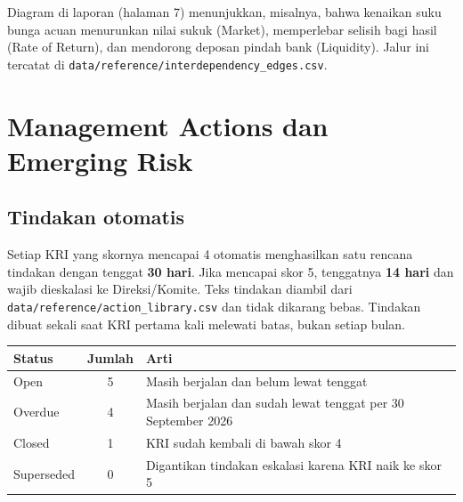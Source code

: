 \documentclass[11pt,a4paper]{article}
\newcommand{\file}[1]{\texttt{\small #1}}
\begin{document}
\begin{infobox}
Diagram di laporan (halaman 7) menunjukkan, misalnya, bahwa kenaikan suku bunga acuan menurunkan nilai sukuk (Market), memperlebar selisih bagi hasil (Rate of Return), dan mendorong deposan pindah bank (Liquidity). Jalur ini tercatat di \file{data/reference/interdependency\_\allowbreak{}edges.csv}.
\end{infobox}
\section{Management Actions dan Emerging Risk}\label{sec:actions}

\subsection{Tindakan otomatis}

Setiap KRI yang skornya mencapai 4 otomatis menghasilkan satu rencana tindakan dengan tenggat \textbf{30 hari}. Jika mencapai skor 5, tenggatnya \textbf{14 hari} dan wajib dieskalasi ke Direksi/Komite. Teks tindakan diambil dari \file{data/reference/action\_\allowbreak{}library.csv} dan tidak dikarang bebas. Tindakan dibuat sekali saat KRI pertama kali melewati batas, bukan setiap bulan.

\begin{center}
\begin{tabular}{lcl}
\toprule
\textbf{Status} & \textbf{Jumlah} & \textbf{Arti} \\
\midrule
Open & 5 & Masih berjalan dan belum lewat tenggat \\
Overdue & 4 & Masih berjalan dan sudah lewat tenggat per 30 September 2026 \\
Closed & 1 & KRI sudah kembali di bawah skor 4 \\
Superseded & 0 & Digantikan tindakan eskalasi karena KRI naik ke skor 5 \\
\bottomrule
\end{tabular}
\end{center}
\end{document}
